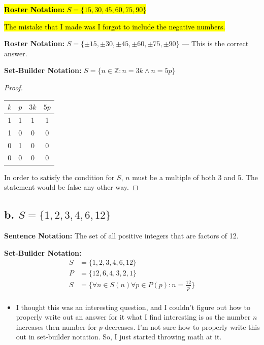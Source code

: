 \documentclass{article}
\begin{document}
    \begin{itemize}
        \item[] \hl{\textbf{Roster Notation: } $S = \{15, 30 , 45, 60, 75, 90\}$}
        \item[] \hl{The mistake that I made was I forgot to include the negative numbers.}
        \item[] \textbf{Roster Notation: } $S = \{\pm 15, \pm 30, \pm 45,\pm 60,\pm 75,\pm 90\}$ --- This is the correct answer.
        \item[] \textbf{Set-Builder Notation: } $S = \{n \in \mathbb{Z} : n = 3k \land n = 5p\}$
        \begin{proof}
        \begin{center} 
        \begin{tabular}{|c|c|c|c|} 
        \hline $k$ & $p$ & $3k$ & $5p$ \\ 
        \hline 
        1 & 1 & 1 & 1 \\
        1 & 0 & 0 & 0  \\
        0 & 1 & 0 & 0 \\
        0 & 0 & 0 & 0  \\
\hline 
\end{tabular} 
\end{center}
        \item[] In order to satisfy the condition for $S$, $n$ must be a multiple of both 3 and 5. The statement would be false any other way.
        \end{proof}
\subsection*{b. $S =\{1,2,3,4,6,12\}$}  

    \item[] \textbf{Sentence Notation: } The set of all positive integers that are factors of 12.
    \item[] \textbf{Set-Builder Notation: } 
    \begin{align*}
        S &=\{1,2,3,4,6,12\} \\
        P &= \{12, 6, 4, 3, 2, 1\}\\ 
        S &= \{\forall n \in S(n) \forall p \in P(p) : n = \frac{12}{p} \} \\
    \end{align*}
    \begin{itemize}
        \item I thought this was an interesting question, and I couldn't figure out how to properly write out an answer for it
        what I find interesting is as the number $n$ increases then number for $p$ decreases. I'm not sure how to properly write this out in set-builder notation.
        So, I just started throwing math at it. 
    \end{itemize}
    \item[]

\end{itemize}
\end{document}
